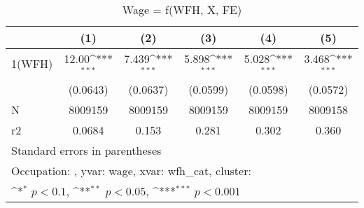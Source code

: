 \begin{table}[htbp]\centering
\def\sym#1{\ifmmode^{#1}\else\(^{#1}\)\fi}
\caption{Wage = f(WFH, X, FE)}
\begin{tabular}{l*{5}{c}}
\hline\hline
                    &\multicolumn{1}{c}{(1)}         &\multicolumn{1}{c}{(2)}         &\multicolumn{1}{c}{(3)}         &\multicolumn{1}{c}{(4)}         &\multicolumn{1}{c}{(5)}         \\
\hline
1(WFH)              &       12.00\sym{***}&       7.439\sym{***}&       5.898\sym{***}&       5.028\sym{***}&       3.468\sym{***}\\
                    &    (0.0643)         &    (0.0637)         &    (0.0599)         &    (0.0598)         &    (0.0572)         \\
\hline
N                   &     8009159         &     8009159         &     8009159         &     8009159         &     8009158         \\
r2                  &      0.0684         &       0.153         &       0.281         &       0.302         &       0.360         \\
\hline\hline
\multicolumn{6}{l}{\footnotesize Standard errors in parentheses}\\
\multicolumn{6}{l}{\footnotesize Occupation: , yvar: wage, xvar: wfh\_cat, cluster: }\\
\multicolumn{6}{l}{\footnotesize \sym{*} \(p<0.1\), \sym{**} \(p<0.05\), \sym{***} \(p<0.001\)}\\
\end{tabular}
\end{table}
